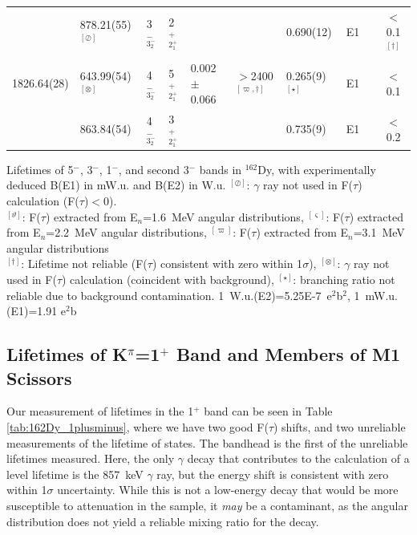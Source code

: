 \begin{landscape}
\begin{center}
\begin{longtable}{clllllllcc}
            &   878.21(55)$^{[\oslash]}$ & 3$^-_{3^-_2}$ & 2$^+_{2^+_1}$      &&                                                            &0.690(12)            & E1    &                                      & $<$0.1 $^{[\dagger]}$     \\ 
 1826.64(28)&   643.99(54)$^{[\otimes]}$ & 4$^-_{3^-_2}$ & 5$^+_{2^+_1}$      &0.002$\pm$0.066& $>$2400 $^{[\varpi,\dagger]}$              &0.265(9) $^{[\star]}$& E1     &                                     & $<$0.1       \\
            &   863.84(54)               & 4$^-_{3^-_2}$ & 3$^+_{2^+_1}$      &&                                                            &0.735(9)             & E1     &                                     & $<$0.2      \\ \hline


\end{longtable}
\end{center}
Lifetimes of 5$^-$, 3$^-$, 1$^-$, and second 3$^-$ bands in $^{162}$Dy, with experimentally deduced B(E1) in mW.u. and B(E2) in W.u.
{\small $^{[\oslash]}$: $\gamma$ ray not used in F($\tau$) calculation (F($\tau$)$<$0).}\\
{\small $^{[\vartheta]}$: F($\tau$) extracted from E$_n$=1.6~MeV angular distributions},
{\small $^{[\varsigma]}$: F($\tau$) extracted from E$_n$=2.2~MeV angular distributions},
{\small $^{[\varpi]}$: F($\tau$) extracted from E$_n$=3.1~MeV angular distributions}\\
{\small $^{[\dagger]}$: Lifetime not reliable (F($\tau$) consistent with zero within 1$\sigma$),}
{\small $^{[\otimes]}$: $\gamma$ ray not used in F($\tau$) calculation (coincident with background), $^{[\star]}$: branching ratio not reliable due to background contamination.}
{\small 1~W.u.(E2)=5.25E-7~e$^2$b$^2$, 1~mW.u.(E1)=1.91 e$^2$b}

\end{landscape}

\subsection{Lifetimes of K$^\pi$=1$^+$ Band and Members of M1 Scissors}
Our measurement of lifetimes in the 1$^+$ band can be seen in Table \ref{tab:162Dy_1plusminus}, where we have two good F($\tau$) shifts, and two unreliable measurements of the lifetime of states. The bandhead is the first of the unreliable lifetimes measured. Here, the only $\gamma$ decay that contributes to the calculation of a level lifetime is the 857~keV $\gamma$ ray, but the energy shift is consistent with zero within 1$\sigma$ uncertainty. While this is not a low-energy decay that would be more susceptible to attenuation in the sample, it \textit{may} be a contaminant, as the angular distribution does not yield a reliable mixing ratio for the decay. 

